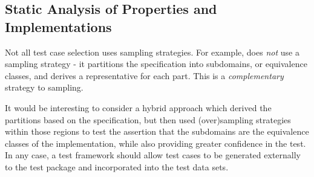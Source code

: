 \subsection{Static Analysis of Properties and Implementations}

Not all test case selection uses sampling strategies.
For example, \HOLTG does \emph{not} use a sampling strategy -
it partitions the specification into subdomains, or equivalence classes,
and derives a representative for each part.
This is a \emph{complementary} strategy to sampling.

It would be interesting to consider a hybrid approach which
derived the partitions based on the specification,
but then used (over)sampling strategies within those regions to
test the assertion that the subdomains are the equivalence classes of
the implementation, while also providing greater confidence in the test.
In any case, a test framework should allow test cases to be generated
externally to the test package and incorporated into the test data sets.

%
%
%
%
